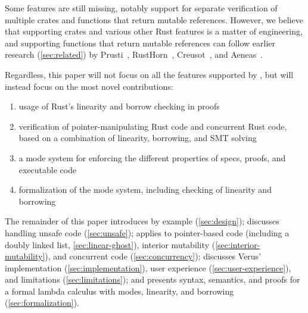 Some features are still missing, notably support for separate verification of multiple crates
and functions that return mutable references.
However, we believe that supporting crates and various other Rust features is a matter of engineering,
and supporting functions that return mutable references can follow earlier research (\autoref{sec:related})
by Prusti~\cite{DBLP:conf/nfm/AstrauskasBFGMM22},
RustHorn~\cite{DBLP:conf/esop/0002T020},
Creusot~\cite{denis:hal-03737878},
and Aeneas~\cite{DBLP:journals/pacmpl/HoP22}.


Regardless, this paper will not focus on all the features supported by \verus,
but will instead focus on the most novel contributions:
\begin{enumerate}
\item usage of Rust's linearity and borrow checking in proofs
\item verification of pointer-manipulating Rust code and concurrent Rust code,
  based on a combination of linearity, borrowing, and SMT solving
\item a mode system for enforcing the different properties of specs, proofs,
  and executable code
\item formalization of the mode system, including checking of linearity and borrowing
\end{enumerate}

The remainder of this paper
introduces \verus by example (\autoref{sec:design});
discusses handling unsafe code (\autoref{sec:unsafe});
applies \verus to pointer-based code (including a doubly linked list, \autoref{sec:linear-ghost}),
interior mutability (\autoref{sec:interior-mutability}),
and concurrent code (\autoref{sec:concurrency});
discusses Verus' implementation (\autoref{sec:implementation}),
user experience (\autoref{sec:user-experience}), and limitations (\autoref{sec:limitations});
and presents syntax, semantics, and proofs for a formal lambda calculus
with modes, linearity, and borrowing (\autoref{sec:formalization}).
